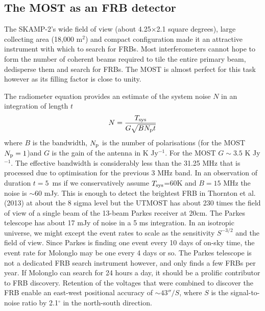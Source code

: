 \subsection{The MOST as an FRB detector}
The SKAMP-2's wide field of view (about 4.25$\times$2.1 square degrees), large collecting area (18,000 m$^2$) and compact configuration made it an attractive instrument with which to search for FRBs. Most interferometers cannot hope to form the number of coherent beams required to tile the entire primary beam, dedisperse them and search for FRBs. The MOST is almost perfect for this task however as its filling factor is close to unity. 

The radiometer equation provides an estimate of the system noise $N$ in an integration of length $t$ 
\begin{equation}
N={{T_{\rm sys}}\over{G\sqrt{BN_{\rm p}t}}}
\end{equation}
\noindent where $B$ is the bandwidth, $N_{\rm p}$ is the number of polarisations (for the MOST $N_{\rm p}=1$)and $G$ is the gain of the antenna in K Jy$^{-1}$. For the MOST $G\sim 3.5$ K Jy$^{-1}$. The effective bandwidth is considerably less than the 31.25 MHz that is processed due to optimisation for the previous 3 MHz band. In an observation of duration $t=5$\, ms if we conservatively assume $T_{\rm sys}$=60K and $B=15 $ MHz the noise is $\sim$60 mJy. This is enough to detect the brightest FRB in Thornton et al. (2013) at about the 8 sigma level but the UTMOST has about 230 times the field of view of a single beam of the 13-beam Parkes receiver at 20cm. The Parkes telescope has about 17 mJy of noise in a 5 ms integration. In an isotropic universe, we might except the event rates to scale as the sensitivity $S^{-3/2}$ and the field of view. Since Parkes is finding one event every 10 days of on-sky time, the event rate for Molonglo may be one every 4 days or so. The Parkes telescope is not a dedicated FRB search instrument however, and only finds a few FRBs per year. If Molonglo can search for 24 hours a day, it should be a prolific contributor to FRB discovery. Retention of the voltages that were combined to discover the FRB enable an east-west positional accuracy of $\sim 43''/S$, where $S$ is the signal-to-noise ratio by 2.1$^{\circ}$ in the north-south direction.
